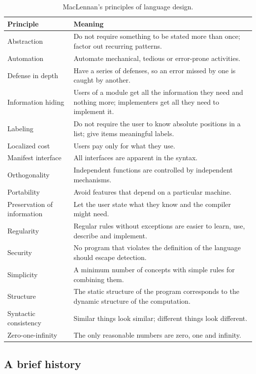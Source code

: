 \begin{table}[h]
\centering
\small
\begin{tabular}{l p{}}
  \toprule
  Principle & Meaning \\
  \midrule
  Abstraction & Do not require something to be stated more than once; factor out recurring patterns. \\
  Automation & Automate mechanical, tedious or error-prone activities. \\
  Defense in depth & Have a series of defenses, so an error missed by one is caught by another. \\
  Information hiding & Users of a module get all the information they need and nothing more; implementers get all they need to implement it. \\
  Labeling & Do not require the user to know absolute positions in a list; give items meaningful labels. \\
  Localized cost & Users pay only for what they use. \\
  Manifest interface & All interfaces are apparent in the syntax. \\
  Orthogonality & Independent functions are controlled by independent mechanisms. \\
  Portability & Avoid features that depend on a particular machine. \\
  Preservation of information & Let the user state what they know and the compiler might need. \\
  Regularity & Regular rules without exceptions are easier to learn, use, describe and implement. \\
  Security & No program that violates the definition of the language should escape detection. \\
  Simplicity & A minimum number of concepts with simple rules for combining them. \\
  Structure & The static structure of the program corresponds to the dynamic structure of the computation. \\
  Syntactic consistency & Similar things look similar; different things look different. \\
  Zero-one-infinity & The only reasonable numbers are zero, one and infinity. \\
  \bottomrule
\end{tabular}
\caption{MacLennan's principles of language design.}
\label{tab:maclennan}
\end{table}

\subsection{A brief history}

